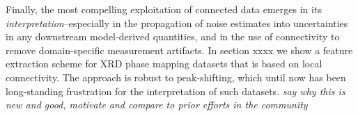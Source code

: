 \documentclass[12pt]{iopart}
\begin{document}
Finally, the most compelling exploitation of connected data emerges in its \emph{interpretation}--especially in the propagation of noise estimates into uncertainties in any downstream model-derived quantities, and in the use of connectivity to remove domain-specific measurement artifacts. In section xxxx we show a feature extraction scheme for XRD phase mapping datasets that is based on local connectivity. The approach is robust to peak-shifting, which until now has been long-standing frustration for the interpretation of such datasets. 
\emph{say why this is new and good, motivate and compare to prior efforts in the community}


%
%
%
%
%

\end{document}
